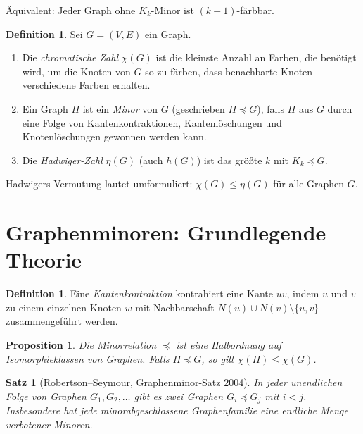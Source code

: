 \documentclass[12pt,a4paper]{amsart}
\newtheorem{satz}[theorem]{Satz}
\newtheorem{proposition}[theorem]{Proposition}
\theoremstyle{definition}
\newtheorem{definition_de}[theorem]{Definition}
\theoremstyle{remark}
\begin{document}
Äquivalent: Jeder Graph ohne $K_k$-Minor ist $(k-1)$-färbbar.

\begin{definition_de}
Sei $G = (V,E)$ ein Graph.
\begin{enumerate}[label=(\alph*)]
  \item Die \emph{chromatische Zahl} $\chi(G)$ ist die kleinste Anzahl an Farben,
        die benötigt wird, um die Knoten von $G$ so zu färben, dass benachbarte
        Knoten verschiedene Farben erhalten.
  \item Ein Graph $H$ ist ein \emph{Minor} von $G$ (geschrieben $H \preceq G$),
        falls $H$ aus $G$ durch eine Folge von Kantenkon\-trak\-tionen, Kantenlöschungen
        und Knotenlöschungen gewonnen werden kann.
  \item Die \emph{Hadwiger-Zahl} $\eta(G)$ (auch $h(G)$) ist das größte $k$
        mit $K_k \preceq G$.
\end{enumerate}
\end{definition_de}

Hadwigers Vermutung lautet umformuliert: $\chi(G) \leq \eta(G)$ für alle Graphen $G$.

\section{Graphenminoren: Grundlegende Theorie}

\begin{definition_de}
Eine \emph{Kantenkontraktion} kontrahiert eine Kante $uv$, indem $u$ und $v$ zu
einem einzelnen Knoten $w$ mit Nachbarschaft $N(u) \cup N(v) \setminus \{u,v\}$
zusammengeführt werden.
\end{definition_de}

\begin{proposition}\label{prop:minoreig}
Die Minorrelation $\preceq$ ist eine Halbordnung auf Isomorphieklassen von Graphen.
Falls $H \preceq G$, so gilt $\chi(H) \leq \chi(G)$.
\end{proposition}

\begin{satz}[Robertson--Seymour, Graphenminor-Satz 2004]\label{satz:GMT}
In jeder unendlichen Folge von Graphen $G_1, G_2, \ldots$ gibt es zwei Graphen
$G_i \preceq G_j$ mit $i < j$. Insbesondere hat jede minorabgeschlossene Graphenfamilie
eine endliche Menge verbotener Minoren.
\end{satz}
\end{document}
